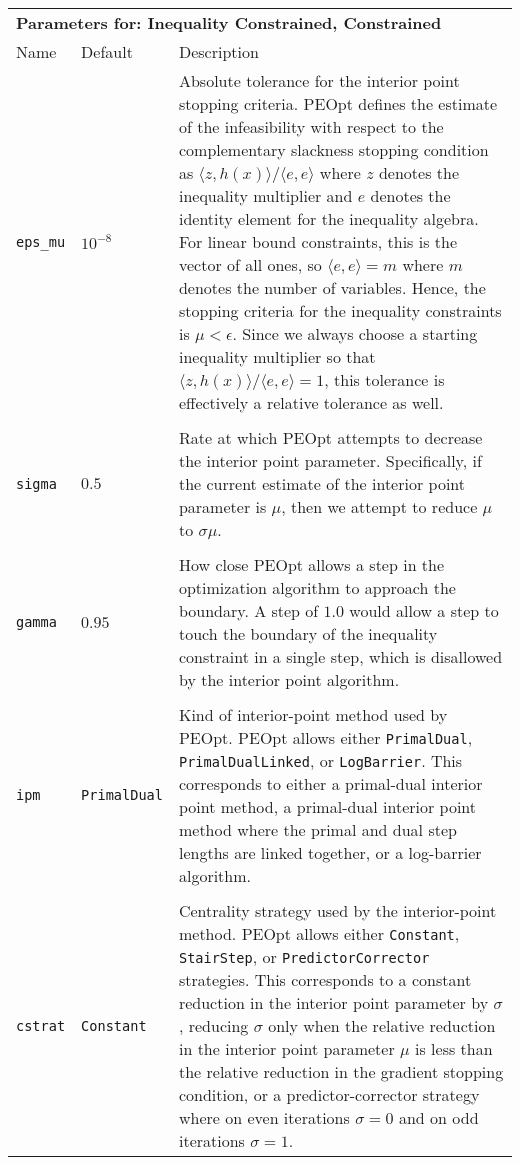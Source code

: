 \documentclass{report}
\begin{document}
\begin{longtable}{llp{}}
\\
\multicolumn{3}{p{\textwidth}}{\bf Parameters for: Inequality Constrained, Constrained}\\
Name & Default & Description\\
\texttt{eps\_mu} & $10^{-8}$
    & Absolute tolerance for the interior point stopping criteria.  PEOpt defines the estimate of the infeasibility with respect to the complementary slackness stopping condition as $\langle z,h(x) \rangle/\langle e,e\rangle$ where $z$ denotes the inequality multiplier and $e$ denotes the identity element for the inequality algebra.  For linear bound constraints, this is the vector of all ones, so $\langle e,e\rangle=m$ where $m$ denotes the number of variables.  Hence, the stopping criteria for the inequality constraints is $\mu < \epsilon$.  Since we always choose a starting inequality multiplier so that $\langle z,h(x) \rangle/\langle e,e\rangle=1$, this tolerance is effectively a relative tolerance as well.\\
\\
\texttt{sigma} & $0.5$
    & Rate at which PEOpt attempts to decrease the interior point parameter.  Specifically, if the current estimate of the interior point parameter is $\mu$, then we attempt to reduce $\mu$ to $\sigma \mu$.\\
\\
\texttt{gamma} & $0.95$
    & How close PEOpt allows a step in the optimization algorithm to approach the boundary.  A step of $1.0$ would allow a step to touch the boundary of the inequality constraint in a single step, which is disallowed by the interior point algorithm.\\
\\
\texttt{ipm} & \texttt{PrimalDual}
    & Kind of interior-point method used by PEOpt.  PEOpt allows either \texttt{PrimalDual}, \texttt{PrimalDualLinked}, or \texttt{LogBarrier}.  This corresponds to either a primal-dual interior point method, a primal-dual interior point method where the primal and dual step lengths are linked together, or a log-barrier algorithm.\\
\\
\texttt{cstrat} & \texttt{Constant}
    & Centrality strategy used by the interior-point method.  PEOpt allows either \texttt{Constant}, \texttt{StairStep}, or \texttt{PredictorCorrector} strategies.  This corresponds to a constant reduction in the interior point parameter by $\sigma$, reducing $\sigma$ only when the relative reduction in the interior point parameter $\mu$ is less than the relative reduction in the gradient stopping condition, or a predictor-corrector strategy where on even iterations $\sigma=0$ and on odd iterations $\sigma=1$.\\

\end{longtable}
\end{document}

